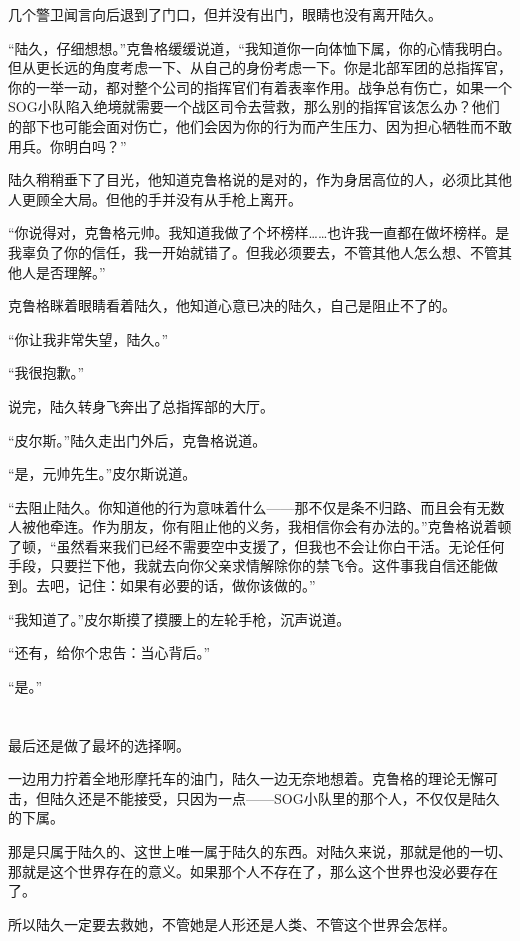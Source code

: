 几个警卫闻言向后退到了门口，但并没有出门，眼睛也没有离开陆久。

“陆久，仔细想想。”克鲁格缓缓说道，“我知道你一向体恤下属，你的心情我明白。但从更长远的角度考虑一下、从自己的身份考虑一下。你是北部军团的总指挥官，你的一举一动，都对整个公司的指挥官们有着表率作用。战争总有伤亡，如果一个SOG小队陷入绝境就需要一个战区司令去营救，那么别的指挥官该怎么办？他们的部下也可能会面对伤亡，他们会因为你的行为而产生压力、因为担心牺牲而不敢用兵。你明白吗？”

陆久稍稍垂下了目光，他知道克鲁格说的是对的，作为身居高位的人，必须比其他人更顾全大局。但他的手并没有从手枪上离开。

“你说得对，克鲁格元帅。我知道我做了个坏榜样……也许我一直都在做坏榜样。是我辜负了你的信任，我一开始就错了。但我必须要去，不管其他人怎么想、不管其他人是否理解。”

克鲁格眯着眼睛看着陆久，他知道心意已决的陆久，自己是阻止不了的。

“你让我非常失望，陆久。”

“我很抱歉。”

说完，陆久转身飞奔出了总指挥部的大厅。

“皮尔斯。”陆久走出门外后，克鲁格说道。

“是，元帅先生。”皮尔斯说道。

“去阻止陆久。你知道他的行为意味着什么——那不仅是条不归路、而且会有无数人被他牵连。作为朋友，你有阻止他的义务，我相信你会有办法的。”克鲁格说着顿了顿，“虽然看来我们已经不需要空中支援了，但我也不会让你白干活。无论任何手段，只要拦下他，我就去向你父亲求情解除你的禁飞令。这件事我自信还能做到。去吧，记住：如果有必要的话，做你该做的。”

“我知道了。”皮尔斯摸了摸腰上的左轮手枪，沉声说道。

“还有，给你个忠告：当心背后。”

“是。”

\section*{}

最后还是做了最坏的选择啊。

一边用力拧着全地形摩托车的油门，陆久一边无奈地想着。克鲁格的理论无懈可击，但陆久还是不能接受，只因为一点——SOG小队里的那个人，不仅仅是陆久的下属。

那是只属于陆久的、这世上唯一属于陆久的东西。对陆久来说，那就是他的一切、那就是这个世界存在的意义。如果那个人不存在了，那么这个世界也没必要存在了。

所以陆久一定要去救她，不管她是人形还是人类、不管这个世界会怎样。

